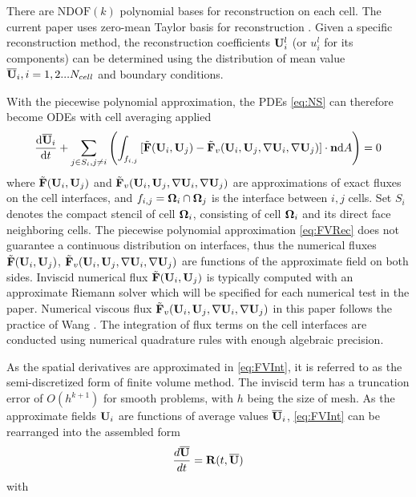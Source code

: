 There are $\mathrm{NDOF}(k)$ polynomial bases for reconstruction on
each cell.
The current paper uses zero-mean Taylor basis
for reconstruction \cite{wang2017compact_VR}.
Given a specific reconstruction method,
the reconstruction coefficients $\mathbf{U}_i^l$ (or $u_i^l$ for
its components) can be determined using
the distribution of mean value $\overline{\mathbf{U}}_i, i=1,2...N_{cell}$
and boundary conditions.

With the piecewise polynomial approximation,
the PDEs \eqref{eq:NS} can therefore become ODEs
with cell averaging applied
\begin{equation}
    \label{eq:FVInt}
    \frac{\dd\overline{\mathbf{U}}_i}{\dd t}
    +\sum_{j\in S_i, j\neq i}{\left(
        \int_{f_{i,j}}{
            [\tilde{\mathbf{F}}(\mathbf{U}_i,\mathbf{U}_j) - \tilde{\mathbf{F}}_v(\mathbf{U}_i,\mathbf{U}_j, \nabla \mathbf{U}_i, \nabla \mathbf{U}_j)] \cdot \mathbf{n}  \dd A
        }\right)
    }
    = 0
\end{equation}
where $\tilde{\mathbf{F}}(\mathbf{U}_i,\mathbf{U}_j)$ and $\tilde{\mathbf{F}}_v(\mathbf{U}_i,\mathbf{U}_j, \nabla \mathbf{U}_i, \nabla \mathbf{U}_j)$ are approximations
of exact fluxes on the cell interfaces,
and $f_{i,j}=\mathbf{\Omega}_i \cap \mathbf{\Omega}_j$ is the interface between $i,j$ cells.
Set $S_i$ denotes the compact stencil of cell $\mathbf{\Omega}_{i}$, consisting
of cell $\mathbf{\Omega}_{i}$ and its direct face neighboring cells.
The piecewise polynomial approximation \eqref{eq:FVRec} does not
guarantee a continuous distribution on interfaces,
thus the numerical fluxes
$\tilde{\mathbf{F}}(\mathbf{U}_i,\mathbf{U}_j)$, $\tilde{\mathbf{F}}_v(\mathbf{U}_i,\mathbf{U}_j, \nabla \mathbf{U}_i, \nabla \mathbf{U}_j)$ are
functions of the approximate field on both sides. Inviscid numerical
flux $\tilde{\mathbf{F}}(\mathbf{U}_i,\mathbf{U}_j)$ is typically computed with an approximate Riemann solver which
will be specified for each numerical test in the paper.
Numerical viscous flux $\tilde{\mathbf{F}}_v(\mathbf{U}_i,\mathbf{U}_j, \nabla \mathbf{U}_i, \nabla \mathbf{U}_j)$
in this paper follows the practice of Wang \cite{wang2017compact_VR}.
The integration of flux terms on the cell interfaces
are conducted using numerical quadrature rules with
enough algebraic precision.

As the spatial derivatives are approximated in \eqref{eq:FVInt},
it is referred to as the semi-discretized form of finite volume method.
The inviscid term has a truncation error of $O(h^{k+1})$ for smooth problems,
with $h$ being the size of mesh. As the approximate fields $\mathbf{U}_i$ are functions
of average values $\overline{\mathbf{U}}_i$, \eqref{eq:FVInt} can be rearranged into the
assembled form
\begin{equation}
    \label{eq:FVODE}
    \frac{d\overline{\mathbf{U}}}{dt} = \mathbf{R}(t, \overline{\mathbf{U}})
\end{equation}
with

